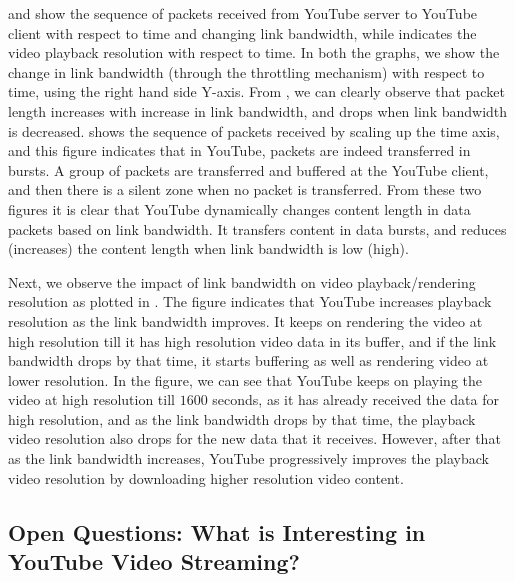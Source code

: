 \fig{\ref{fig:packet}} and \fig{\ref{fig:burst}} show the sequence of packets received from YouTube server to YouTube client with respect to time and changing link bandwidth, while \fig{\ref{fig:reso}} indicates the video playback resolution with respect to time. In both the graphs, we show the change in link bandwidth (through the throttling mechanism) with respect to time, using the right hand side Y-axis. From \fig{\ref{fig:packet}}, we can clearly observe that packet length increases with increase in link bandwidth, and drops when link bandwidth is decreased. \fig{\ref{fig:burst}} shows the sequence of packets received by scaling up the time axis, and this figure indicates that in YouTube, packets are indeed transferred in bursts. A group of packets are transferred and buffered at the YouTube client, and then there is a silent zone when no packet is transferred. From these two figures it is clear that YouTube dynamically changes content length in data packets based on link bandwidth. It transfers content in data bursts, and reduces (increases) the content length when link bandwidth is low (high). 

Next, we observe the impact of link bandwidth on video playback/rendering resolution as plotted in \fig{\ref{fig:reso}}. The figure indicates that YouTube increases playback resolution as the link bandwidth improves. It keeps on rendering the video at high resolution till it has high resolution video data in its buffer, and if the link bandwidth drops by that time, it starts buffering as well as rendering video at lower resolution. In the figure, we can see that YouTube keeps on playing the video at high resolution till $1600$ seconds, as it has already received the data for high resolution, and as the link bandwidth drops by that time, the playback video resolution also drops for the new data that it receives. However, after that as the link bandwidth increases, YouTube progressively improves the playback video resolution by downloading higher resolution video content.

\subsection{Open Questions: What is Interesting in YouTube Video Streaming?}

